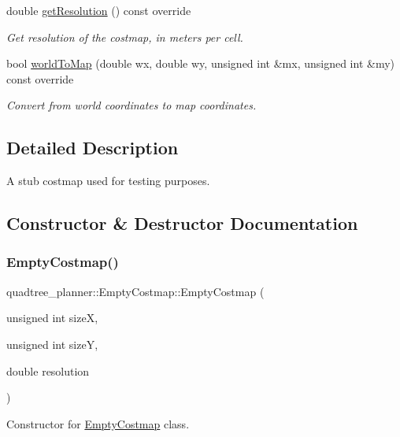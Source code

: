 \begin{DoxyCompactItemize}
double \hyperlink{classquadtree__planner_1_1EmptyCostmap_a2401c36e2f5c93fc9ae3dde9fc9ac930}{get\+Resolution} () const override
\begin{DoxyCompactList}\small\item\em Get resolution of the costmap, in meters per cell. \end{DoxyCompactList}\item 
bool \hyperlink{classquadtree__planner_1_1EmptyCostmap_a329690825d4e3789189dc0b99c891786}{world\+To\+Map} (double wx, double wy, unsigned int \&mx, unsigned int \&my) const override
\begin{DoxyCompactList}\small\item\em Convert from world coordinates to map coordinates. \end{DoxyCompactList}\end{DoxyCompactItemize}


\subsection{Detailed Description}
A stub costmap used for testing purposes. 

\subsection{Constructor \& Destructor Documentation}
\mbox{\label{classquadtree__planner_1_1EmptyCostmap_ac76dfd72c0366cc6ea8cf63a9adde273}} 
\subsubsection{\texorpdfstring{Empty\+Costmap()}{EmptyCostmap()}}
{\footnotesize\ttfamily quadtree\+\_\+planner\+::\+Empty\+Costmap\+::\+Empty\+Costmap (\begin{DoxyParamCaption}\item[{unsigned int}]{sizeX,  }\item[{unsigned int}]{sizeY,  }\item[{double}]{resolution }\end{DoxyParamCaption})}



Constructor for \hyperlink{classquadtree__planner_1_1EmptyCostmap}{Empty\+Costmap} class. 


